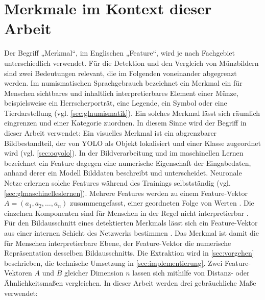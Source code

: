 \section{Merkmale im Kontext dieser Arbeit}
\label{sec:merkmale}
Der Begriff „Merkmal“, im Englischen „Feature“, wird je nach Fachgebiet unterschiedlich verwendet. Für die Detektion und den Vergleich von Münzbildern sind zwei Bedeutungen relevant, die im Folgenden voneinander abgegrenzt werden.
Im numismatischen Sprachgebrauch bezeichnet ein Merkmal ein für Menschen sichtbares und inhaltlich interpretierbares Element einer Münze, beispielsweise ein Herrscherporträt, eine Legende, ein Symbol oder eine Tierdarstellung (vgl. \cref{sec:glnumismatik}). Ein solches Merkmal lässt sich räumlich eingrenzen und einer Kategorie zuordnen. In diesem Sinne wird der Begriff in dieser Arbeit verwendet: Ein visuelles Merkmal ist ein abgrenzbarer Bildbestandteil, der von YOLO als Objekt lokalisiert und einer Klasse zugeordnet wird (vgl. \cref{sec:ooyolo}).
In der Bildverarbeitung und im maschinellen Lernen bezeichnet ein Feature dagegen eine numerische Eigenschaft der Eingabedaten, anhand derer ein Modell Bilddaten beschreibt und unterscheidet. Neuronale Netze erlernen solche Features während des Trainings selbstständig (vgl. \cref{sec:glmaschinelleslernen}). Mehrere Features werden zu einem Feature-Vektor 
$ A = (a_1, a_2, \dots, a_n) $ zusammengefasst, einer geordneten Folge von Werten \cite{duda2001pattern,bishop2006pattern} . Die einzelnen Komponenten sind für Menschen in der Regel nicht interpretierbar \cite{montavon2018methods}. 
Für den Bildausschnitt eines detektierten Merkmals lässt sich ein Feature-Vektor aus einer internen Schicht des Netzwerks bestimmen \cite{ultralytics-predict,zhang2019recent}. Das Merkmal ist damit die für Menschen interpretierbare Ebene, der Feature-Vektor die numerische Repräsentation desselben Bildausschnitts. Die Extraktion wird in \cref{sec:vorgehen} beschrieben, die technische Umsetzung in \cref{sec:implementierung}.
Zwei Feature-Vektoren $ A $ und $ B $ gleicher Dimension $ n $ lassen sich mithilfe von Distanz- oder Ähnlichkeitsmaßen vergleichen. In dieser Arbeit werden drei gebräuchliche Maße verwendet:
